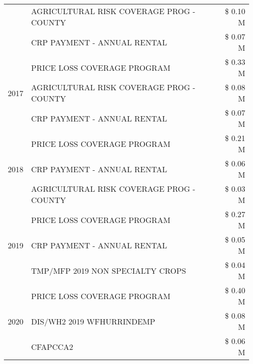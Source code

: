 \begin{tabular}{llr}
 & AGRICULTURAL RISK COVERAGE PROG - COUNTY      & \$ 0.10 M \\
 & CRP PAYMENT - ANNUAL RENTAL                   & \$ 0.07 M \\
\cline{1-3}
\multirow[t]{3}{*}{2017} & PRICE LOSS COVERAGE PROGRAM & \$ 0.33 M \\
 & AGRICULTURAL RISK COVERAGE PROG - COUNTY & \$ 0.08 M \\
 & CRP PAYMENT - ANNUAL RENTAL & \$ 0.07 M \\
\cline{1-3}
\multirow[t]{3}{*}{2018} & PRICE LOSS COVERAGE PROGRAM & \$ 0.21 M \\
 & CRP PAYMENT - ANNUAL RENTAL & \$ 0.06 M \\
 & AGRICULTURAL RISK COVERAGE PROG - COUNTY & \$ 0.03 M \\
\cline{1-3}
\multirow[t]{3}{*}{2019} & PRICE LOSS COVERAGE PROGRAM & \$ 0.27 M \\
 & CRP PAYMENT - ANNUAL RENTAL & \$ 0.05 M \\
 & TMP/MFP 2019 NON SPECIALTY CROPS & \$ 0.04 M \\
\cline{1-3}
\multirow[t]{3}{*}{2020} & PRICE LOSS COVERAGE PROGRAM & \$ 0.40 M \\
 & DIS/WH2 2019 WFHURRINDEMP & \$ 0.08 M \\
 & CFAPCCA2 & \$ 0.06 M \\
\cline{1-3}
\bottomrule
\end{tabular}
